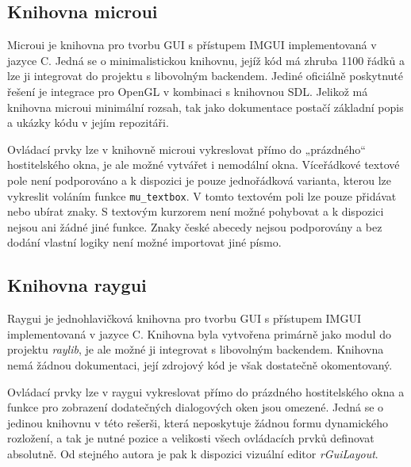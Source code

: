 \documentclass[FM,DP]{tulthesis}
\begin{document}
	
	\subsection{Knihovna microui}
	
	Microui \cite{online_microui} je knihovna pro tvorbu GUI s přístupem IMGUI implementovaná v \mbox{jazyce} C. Jedná se o minimalistickou knihovnu, jejíž kód má zhruba 1100 řádků a lze ji integrovat do projektu s libovolným backendem. Jediné oficiálně poskytnuté \mbox{řešení} je integrace pro OpenGL v kombinaci s knihovnou SDL. Jelikož má knihovna microui minimální rozsah, tak jako dokumentace postačí základní popis a ukázky kódu v jejím repozitáři.
	
	Ovládací prvky lze v knihovně microui vykreslovat přímo do „prázdného“ hostitelského okna, je ale možné vytvářet i nemodální okna. Víceřádkové textové pole není podporováno a k dispozici je pouze jednořádková varianta, kterou lze vykreslit voláním funkce \texttt{mu\_textbox}. V tomto textovém poli lze pouze přidávat nebo ubírat znaky. S textovým kurzorem není možné pohybovat a k dispozici nejsou ani žádné jiné funkce. Znaky české abecedy nejsou podporovány a bez dodání vlastní logiky není možné importovat jiné písmo.
	
	\subsection{Knihovna raygui}
	
	Raygui \cite{online_raygui} je jednohlavičková knihovna pro tvorbu GUI s přístupem IMGUI implementovaná v jazyce C. Knihovna byla vytvořena primárně jako modul do projektu \textit{raylib}, je ale možné ji integrovat s libovolným backendem. Knihovna nemá žádnou dokumentaci, její zdrojový kód je však dostatečně okomentovaný.
	
	Ovládací prvky lze v raygui vykreslovat přímo do prázdného hostitelského okna a funkce pro zobrazení dodatečných dialogových oken jsou omezené. Jedná se o jedinou knihovnu v této rešerši, která neposkytuje žádnou formu dynamického rozložení, a tak je nutné pozice a velikosti všech ovládacích prvků definovat absolutně. Od stejného autora je pak k dispozici vizuální editor \textit{rGuiLayout}.%
	
\end{document}
